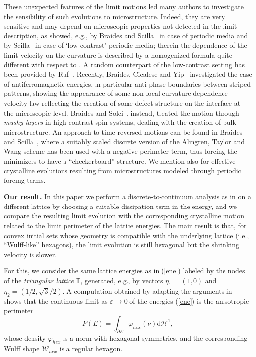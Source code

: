 \documentclass{interact}
\numberwithin{equation}{section}
\theoremstyle{definition}
\renewcommand{\H}{\mathcal{H}}
\renewcommand{\epsilon}{\varepsilon}
\begin{document}
These unexpected features of the limit motions led many authors to investigate the sensibility of such evolutions to microstructure. Indeed, they are very sensitive and may depend on microscopic properties not detected in the limit description, as showed, e.g., by Braides and Scilla~\cite{BraSci} in case of periodic media and by Scilla~\cite{Sci14} in case of `low-contrast' periodic media; therein the dependence of the limit velocity on the curvature is described by a homogenized formula quite different with respect to \cite{BGN}. A random counterpart of the low-contrast setting has been provided by Ruf~\cite{Ruf}.  Recently, Braides, Cicalese and Yip~\cite{BCY} investigated the case of antiferromagnetic energies, in particular anti-phase boundaries between striped patterns, showing the appearance of some non-local curvature dependence velocity law reflecting the creation of some defect structure on the interface at the microscopic level. Braides and Solci~\cite{BraSo15}, instead, treated the motion through \emph{mushy layers} in high-contrast spin systems, dealing with the creation of bulk microstructure. An approach to time-reversed motions can be found in Braides and Scilla~\cite{BraSci2}, where a suitably scaled discrete version of the Almgren, Taylor and Wang scheme has been used with a negative perimeter term, thus forcing the minimizers to have a ``checkerboard'' structure. We mention also \cite{BMN, MN} for effective crystalline evolutions resulting from microstructures modeled through periodic forcing terms.

\noindent
{\bf Our result.} In this paper we perform a discrete-to-continuum analysis as in \cite{BGN} on a different lattice by choosing a suitable dissipation term in the energy, and we compare the resulting limit evolution with the corresponding crystalline motion related to the limit perimeter of the lattice energies. The main result is that, for convex initial sets whose geometry is compatible with the underlying lattice (i.e., ``Wulff-like'' hexagons), the limit evolution is still hexagonal but the shrinking velocity is slower.

For this, we consider the same lattice energies as in (\ref{ene}) labeled by the nodes of the \emph{triangular lattice} $\mathbb{T}$, generated, e.g., by vectors $\eta_1=(1,0)$ and $\eta_2=(1/2,\sqrt{3}/2)$.
A computation obtained by adapting the arguments in~\cite{ABC,BG} shows that the continuous limit as $\epsilon\to0$ of the energies (\ref{ene}) is the {anisotropic perimeter}
\begin{equation}
{P}(E)=\int_{\partial E}\varphi_{hex}(\nu)\mathrm{d}\H^1,
\label{hexagonalper}
\end{equation}
whose density $\varphi_{hex}$ is a norm %
with hexagonal symmetries, and the corresponding Wulff shape $\mathcal{W}_{hex}$ is a regular hexagon. 
\end{document}
